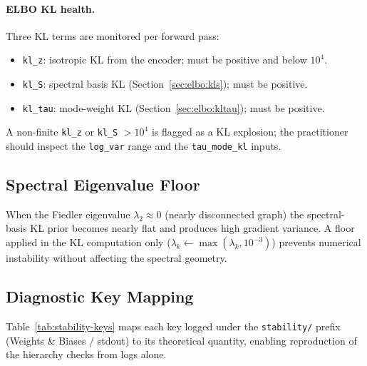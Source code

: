 \documentclass[11pt,a4paper]{article}
\begin{document}
\paragraph{ELBO KL health.}
Three KL terms are monitored per forward pass:
\begin{itemize}
  \item \texttt{kl\_z}: isotropic KL from the encoder; must be positive and
        below $10^4$.
  \item \texttt{kl\_S}: spectral basis KL (Section~\ref{sec:elbo:kls}); must
        be positive.
  \item \texttt{kl\_tau}: mode-weight KL (Section~\ref{sec:elbo:kltau}); must
        be positive.
\end{itemize}
A non-finite \texttt{kl\_z} or \texttt{kl\_S} $> 10^4$ is flagged as a KL
explosion; the practitioner should inspect the \texttt{log\_var} range and the
\texttt{tau\_mode\_kl} inputs.

\subsection{Spectral Eigenvalue Floor}
\label{sec:stability:floor}

When the Fiedler eigenvalue $\lambda_2 \approx 0$ (nearly disconnected graph)
the spectral-basis KL prior becomes nearly flat and produces high gradient
variance.  A floor applied in the KL computation only
($\lambda_k \leftarrow \max(\lambda_k, 10^{-3})$) prevents numerical
instability without affecting the spectral geometry.

\subsection{Diagnostic Key Mapping}
\label{sec:stability:keys}

Table~\ref{tab:stability-keys} maps each key logged under the
\texttt{stability/} prefix (Weights \& Biases / stdout) to its theoretical
quantity, enabling reproduction of the hierarchy checks from logs alone.
\end{document}

